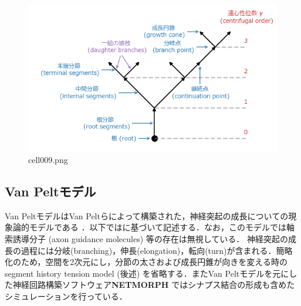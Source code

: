 \begin{figure}[ht]
	\centering
	\includegraphics[scale=0.8, max width=\linewidth]{./fig/neuron-model/neurite-growth-model/cell009.png}
	\caption{cell009.png}
	\label{cell009.png}
\end{figure}
\subsection{Van Peltモデル}
Van PeltモデルはVan Peltらによって構築された，神経突起の成長についての現象論的モデルである \citep{Van_Pelt2002-vm}．以下では\citep{Koene2009-hv}に基づいて記述する．なお，このモデルでは軸索誘導分子 (axon guidance molecules) 等の存在は無視している．
神経突起の成長の過程には分岐(branching)，伸長(elongation)，転向(turn)が含まれる．簡略化のため，空間を2次元にし，分節の太さおよび成長円錐が向きを変える時のsegment history tension model (後述) を省略する．またVan Peltモデルを元にした神経回路構築ソフトウェア\textbf{NETMORPH} \citep{Koene2009-hv}ではシナプス結合の形成も含めたシミュレーションを行っている．
